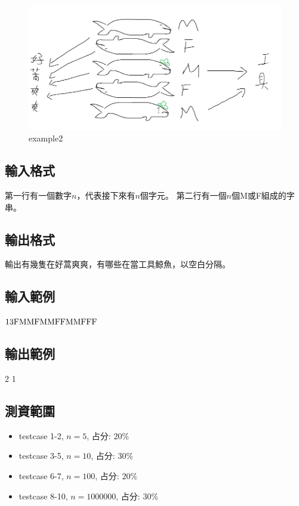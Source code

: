 \documentclass{article}
\begin{document}
\begin{CJK*}{UTF8}{bsmi}
\begin{figure}[htb]
    \vspace{-\baselineskip}  
    \begin{center}
        \includegraphics[scale=0.6]{whale-example2.png}
      \caption{example2}
      \label{fig:example2}
    \end{center}
    \vspace{-\baselineskip}
\end{figure}

\subsection*{輸入格式}
第一行有一個數字$n$，代表接下來有$n$個字元。
第二行有一個$n$個M或F組成的字串。

\subsection*{輸出格式}
輸出有幾隻在好蒿爽爽，有哪些在當工具鯨魚，以空白分隔。

\subsection*{輸入範例}
$13\\\text{FMMFMMFFMMFFF}$

\subsection*{輸出範例}
2 1

\subsection*{測資範圍}
\begin{itemize}
    \item testcase 1-2, $n=5$, 占分: $20\%$
    \item testcase 3-5, $n=10$, 占分: $30\%$
    \item testcase 6-7, $n=100$, 占分: $20\%$
    \item testcase 8-10, $n=1000000$, 占分: $30\%$
\end{itemize}

\end{CJK*}
\end{document}

